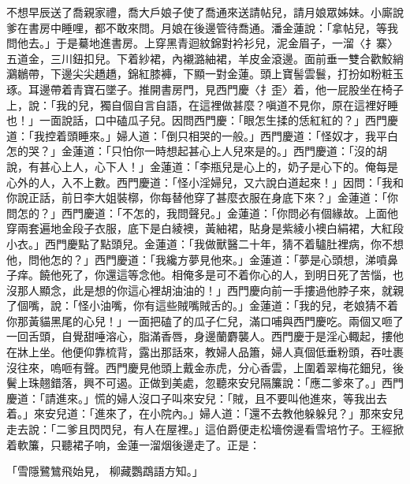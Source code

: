 \begin{showcontents}{}
不想早辰送了喬親家禮，喬大戶娘子使了喬通來送請帖兒，請月娘眾姊妹。小廝說爹在書房中睡哩，都不敢來問。月娘在後邊管待喬通。潘金蓮說：「拿帖兒，等我問他去。」于是驀地進書房。上穿黑青迴紋錦對衿衫兒，泥金眉子，一溜〈扌寨〉五道金，三川鈕扣兒。下着紗裙，內襯潞紬裙，羊皮金滾邊。面前垂一雙合歡鮫綃鸂鶒帶，下邊尖尖趫趫，錦紅膝褲，下顯一對金蓮。頭上寶髻雲鬟，打扮如粉粧玉琢。耳邊帶着青寶石墜子。推開書房門，見西門慶〈扌歪〉着，他一屁股坐在椅子上，說：「我的兒，獨自個自言自語，在這裡做甚麼？嗔道不見你，原在這裡好睡也！」一面說話，口中磕瓜子兒。因問西門慶：「眼怎生揉的恁紅紅的？」西門慶道：「我控着頭睡來。」婦人道：「倒只相哭的一般。」西門慶道：「怪奴才，我平白怎的哭？」金蓮道：「只怕你一時想起甚心上人兒來是的。」西門慶道：「沒的胡說，有甚心上人，心下人！」金蓮道：「李瓶兒是心上的，奶子是心下的。俺每是心外的人，入不上數。西門慶道：「怪小淫婦兒，又六說白道起來！」因問：「我和你說正話，前日李大姐裝槨，你每替他穿了甚麼衣服在身底下來？」金蓮道：「你問怎的？」西門慶道：「不怎的，我問聲兒。」金蓮道：「你問必有個緣故。上面他穿兩套遍地金段子衣服，底下是白綾襖，黃紬裙，貼身是紫綾小襖白絹裙，大紅段小衣。」西門慶點了點頭兒。金蓮道：「我做獸醫二十年，猜不着驢肚裡病，你不想他，問他怎的？」西門慶道：「我纔方夢見他來。」金蓮道：「夢是心頭想，涕噴鼻子痒。饒他死了，你還這等念他。相俺多是可不着你心的人，到明日死了苦惱，也沒那人顯念，此是想的你這心裡胡油油的！」西門慶向前一手摟過他脖子來，就親了個嘴，說：「怪小油嘴，你有這些賊嘴賊舌的。」金蓮道：「我的兒，老娘猜不着你那黃貓黑尾的心兒！」一面把磕了的瓜子仁兒，滿口哺與西門慶吃。兩個又咂了一回舌頭，自覺甜唾溶心，脂滿香唇，身邊蘭麝襲人。西門慶于是淫心輙起，摟他在牀上坐。他便仰靠梳背，露出那話來，教婦人品簫，婦人真個低垂粉頭，吞吐裹沒往來，嗚咂有聲。西門慶見他頭上戴金赤虎，分心香雲，上圍着翠梅花鈿兒，後鬢上珠翹錯落，興不可遏。正做到美處，忽聽來安兒隔簾說：「應二爹來了。」西門慶道：「請進來。」慌的婦人沒口子叫來安兒：「賊，且不要叫他進來，等我出去着。」來安兒道：「進來了，在小院內。」婦人道：「還不去教他躲躲兒？」那來安兒走去說：「二爹且閃閃兒，有人在屋裡。」這伯爵便走松墻傍邊看雪培竹子。王經掀着軟簾，只聽裙子响，金蓮一溜烟後邊走了。正是：

「雪隱鷺鷥飛始見，  柳藏鸚鵡語方知。」


\end{showcontents}
